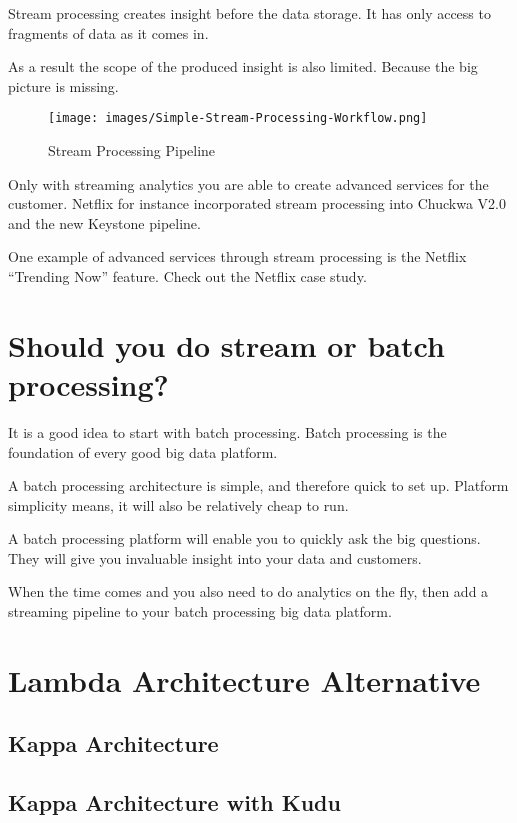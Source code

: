 \documentclass[12pt, numbers=noenddot]{scrreprt} %
\begin{document}
Stream processing creates insight before the data storage. It has only access to fragments of data as it comes in.

As a result the scope of the produced insight is also limited. Because the big picture is missing.

\begin{figure}[htbp]
  \centering
     \texttt{[image: images/Simple-Stream-Processing-Workflow.png]}
  \caption{Stream Processing Pipeline}
  \label{fig:Bild1}
\end{figure}

Only with streaming analytics you are able to create advanced services for the customer. Netflix for instance incorporated stream processing into Chuckwa V2.0 and the new Keystone pipeline.

One example of advanced services through stream processing is the Netflix “Trending Now” feature.
Check out the Netflix case study.

\section{Should you do stream or batch processing?}

It is a good idea to start with batch processing. Batch processing is the foundation of every good big data platform.

A batch processing architecture is simple, and therefore quick to set up. Platform simplicity means, it will also be relatively cheap to run.

A batch processing platform will enable you to quickly ask the big questions. They will give you invaluable insight into your data and customers.

When the time comes and you also need to do analytics on the fly, then add a streaming pipeline to your batch processing big data platform.


\section{Lambda Architecture Alternative }
\subsection{Kappa Architecture}
\subsection{Kappa Architecture with Kudu}
\end{document}
